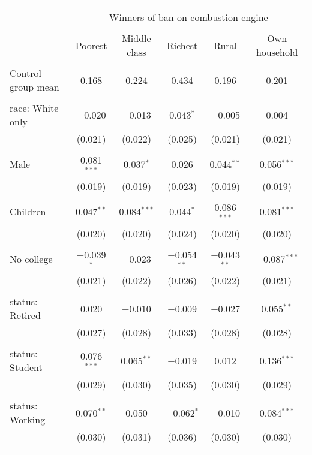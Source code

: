 
\begin{tabular}{@{\extracolsep{5pt}}lccccc} 
\\[-1.8ex]\hline 
\hline \\[-1.8ex] 
 & \multicolumn{5}{c}{Winners of ban on combustion engine} \\ 
\cline{2-6} 
\\[-1.8ex] & Poorest & Middle class & Richest & Rural & Own household \\ 
\hline \\[-1.8ex] 
 Control group mean & 0.168 & 0.224 & 0.434 & 0.196 & 0.201  \\ \hline \\[-1.8ex] race: White only & $-$0.020 & $-$0.013 & 0.043$^{*}$ & $-$0.005 & 0.004 \\ 
  & (0.021) & (0.022) & (0.025) & (0.021) & (0.021) \\ 
  & & & & & \\ 
 Male & 0.081$^{***}$ & 0.037$^{*}$ & 0.026 & 0.044$^{**}$ & 0.056$^{***}$ \\ 
  & (0.019) & (0.019) & (0.023) & (0.019) & (0.019) \\ 
  & & & & & \\ 
 Children & 0.047$^{**}$ & 0.084$^{***}$ & 0.044$^{*}$ & 0.086$^{***}$ & 0.081$^{***}$ \\ 
  & (0.020) & (0.020) & (0.024) & (0.020) & (0.020) \\ 
  & & & & & \\ 
 No college & $-$0.039$^{*}$ & $-$0.023 & $-$0.054$^{**}$ & $-$0.043$^{**}$ & $-$0.087$^{***}$ \\ 
  & (0.021) & (0.022) & (0.026) & (0.022) & (0.021) \\ 
  & & & & & \\ 
 status: Retired & 0.020 & $-$0.010 & $-$0.009 & $-$0.027 & 0.055$^{**}$ \\ 
  & (0.027) & (0.028) & (0.033) & (0.028) & (0.028) \\ 
  & & & & & \\ 
 status: Student & 0.076$^{***}$ & 0.065$^{**}$ & $-$0.019 & 0.012 & 0.136$^{***}$ \\ 
  & (0.029) & (0.030) & (0.035) & (0.030) & (0.029) \\ 
  & & & & & \\ 
 status: Working & 0.070$^{**}$ & 0.050 & $-$0.062$^{*}$ & $-$0.010 & 0.084$^{***}$ \\ 
  & (0.030) & (0.031) & (0.036) & (0.030) & (0.030) \\ 
  & & & & & \\ 

\end{tabular}
